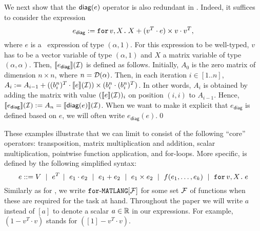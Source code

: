 \begin{example}\label{ex:diag}
We next show that the $\textsf{diag}(e)$ operator is also redundant in \langfor.
Indeed, it suffices to consider the expression
$$e_{\mathsf{diag}}:=
\texttt{for}\, v,X \texttt{.}\, X + (v^T\cdot e) \times v\cdot v^T,$$ where $e$ is a \langfor\  expression of type $(\alpha,1)$. For this expression to be well-typed, $v$ has to be a vector variable of type $(\alpha,1)$ and $X$ a matrix variable of type $(\alpha,\alpha)$. Then, $\llbracket e_{\mathsf{diag}} \rrbracket(\mathcal{I})$ is defined as follows.
Initially, $A_0$ is the zero matrix of dimension $n\times n$, where $n=\mathcal{D}(\alpha)$. Then, in each iteration
$i\in[1..n]$, $A_{i}:=A_{i-1}+  ((b_i^n)^T\cdot\llbracket e \rrbracket(\mathcal{I}))\times (b_i^n\cdot (b_i^n)^T)$. In other words, $A_i$ is obtained by adding the matrix with value $(\llbracket e \rrbracket(\mathcal{I}))_i$ on position $(i,i)$ to $A_{i-1}$. Hence, $\llbracket e_{\mathsf{diag}} \rrbracket(\mathcal{I}):=A_n=\llbracket \textsf{diag}(e) \rrbracket(\mathcal{I})$. When we want to make it explicit that $e_\mathsf{diag}$ is defined based on $e$, we will often write $e_\mathsf{diag}(e)$.\qed
 \end{example}

These examples illustrate that we can limit \langfor to consist of the following ``core'' operators: transposition, matrix multiplication and addition, scalar multiplication, pointwise function application, and for-loops. More specific, \langfor is defined by the following simplified syntax:
$$
e ::= V \ \mid \ e^T \!\ \mid \ e_1 \cdot e_2 \ \mid \ e_1 + e_2 \ \mid \ e_1\times e_2  \ \mid \  f(e_1,\ldots ,e_k) \ \mid \ \texttt{for}\, v,X \texttt{.}\, e
$$
Similarly as for \lang, we write $\texttt{for}\text{-}\texttt{MATLANG}[\mathcal{F}]$ for some set $\mathcal{F}$ of functions when these are required for the task at hand. Throughout the paper we will write $a$ instead of $[a]$ to denote a scalar $a\in\mathbb{R}$ in our expressions. For example,  $(1-v^T\cdot v)$ stands for  $([1]-v^T\cdot v)$. 

